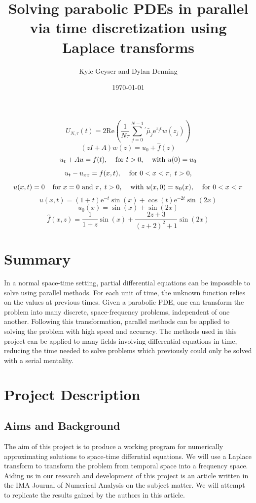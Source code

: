 \documentclass[letterpaper, 12pt]{article}
\title{Solving parabolic PDEs in parallel via time discretization using Laplace transforms}
\author{Kyle Geyser and Dylan Denning}
\date{\today}
\def\e{\text{e}}
\begin{document}
 \maketitle
 
 
 $$U_{N,\tau}(t)=2\text{Re}\left(\frac{1}{N\tau}\sum_{j=0}^{N-1}{}^\prime \tilde{\mu_j}\e^{z_jt}w(z_j)\right)$$
 $$(zI+A)w(z)=u_0+\hat{f}(z)$$
 $$u_t+Au=f(t),\hspace{4mm}\text{for }t>0,\hspace{4mm}\text{with }u(0)=u_0$$
 $$u_t-u_{xx}=f(x,t),\hspace{4mm}\text{for }0<x<\pi,\;t>0,$$
 $$u(x,t)=0\hspace{4mm}\text{for }x=0\text{ and }\pi,\;t>0,\hspace{4mm}\text{with }u(x,0)=u_0(x),\hspace{4mm}\text{for }0<x<\pi$$
 $$u(x,t)=(1+t)\e^{-t}\sin(x)+\cos(t)\e^{-2t}\sin(2x)$$
 $$u_0(x)=\sin(x)+\sin(2x)$$
 $$\hat{f}(x,z)=\frac{1}{1+z}\sin(x)+\frac{2z+3}{(z+2)^2+1}\sin(2x)$$
 
	
	\section*{Summary}
	\hspace{5mm} In a normal space-time setting, partial differential equations can be impossible to solve using parallel methods. For each unit of time, the unknown function relies on the values at previous times. Given a parabolic PDE, one can transform the problem into many discrete, space-frequency problems, independent of one another. Following this transformation, parallel methods can be applied to solving the problem with high speed and accuracy. The methods used in this project can be applied to many fields involving differential equations in time, reducing the time needed to solve problems which previously could only be solved with a serial mentality.
	
	\section*{Project Description}
	\subsection*{Aims and Background}
	\hspace{5mm} The aim of this project is to produce a working program for numerically approximating solutions to space-time differntial equations. We will use a Laplace transform to transform the problem from temporal space into a frequency space. Aiding us in our research and development of this project is an article\cite{sheen03} written in the IMA Journal of Numerical Analysis on the subject matter. We will attempt to replicate the results gained by the authors in this article.
	
\end{document}
